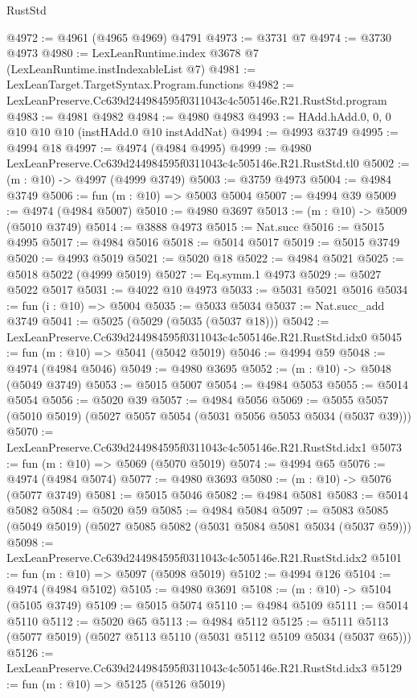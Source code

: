 \begin{lexlean}{RustStd}
\begin{coremodule}
@4972 := @4961 (@4965 @4969) @4791
@4973 := @3731 @7
@4974 := @3730 @4973
@4980 := LexLeanRuntime.index @3678 @7 (LexLeanRuntime.instIndexableList @7)
@4981 := LexLeanTarget.TargetSyntax.Program.functions
@4982 := LexLeanPreserve.Cc639d244984595f0311043c4c505146e.R21.RustStd.program
@4983 := @4981 @4982
@4984 := @4980 @4983
@4993 := HAdd.hAdd.{0, 0, 0} @10 @10 @10 (instHAdd.{0} @10 instAddNat)
@4994 := @4993 @3749
@4995 := @4994 @18
@4997 := @4974 (@4984 @4995)
@4999 := @4980 LexLeanPreserve.Cc639d244984595f0311043c4c505146e.R21.RustStd.tl0
@5002 := (m : @10) -> @4997 (@4999 @3749)
@5003 := @3759 @4973
@5004 := @4984 @3749
@5006 := fun (m : @10) => @5003 @5004
@5007 := @4994 @39
@5009 := @4974 (@4984 @5007)
@5010 := @4980 @3697
@5013 := (m : @10) -> @5009 (@5010 @3749)
@5014 := @3888 @4973
@5015 := Nat.succ
@5016 := @5015 @4995
@5017 := @4984 @5016
@5018 := @5014 @5017
@5019 := @5015 @3749
@5020 := @4993 @5019
@5021 := @5020 @18
@5022 := @4984 @5021
@5025 := @5018 @5022 (@4999 @5019)
@5027 := Eq.symm.{1} @4973
@5029 := @5027 @5022 @5017
@5031 := @4022 @10 @4973
@5033 := @5031 @5021 @5016
@5034 := fun (i : @10) => @5004
@5035 := @5033 @5034
@5037 := Nat.succ_add @3749
@5041 := @5025 (@5029 (@5035 (@5037 @18)))
@5042 := LexLeanPreserve.Cc639d244984595f0311043c4c505146e.R21.RustStd.idx0
@5045 := fun (m : @10) => @5041 (@5042 @5019)
@5046 := @4994 @59
@5048 := @4974 (@4984 @5046)
@5049 := @4980 @3695
@5052 := (m : @10) -> @5048 (@5049 @3749)
@5053 := @5015 @5007
@5054 := @4984 @5053
@5055 := @5014 @5054
@5056 := @5020 @39
@5057 := @4984 @5056
@5069 := @5055 @5057 (@5010 @5019) (@5027 @5057 @5054 (@5031 @5056 @5053 @5034 (@5037 @39)))
@5070 := LexLeanPreserve.Cc639d244984595f0311043c4c505146e.R21.RustStd.idx1
@5073 := fun (m : @10) => @5069 (@5070 @5019)
@5074 := @4994 @65
@5076 := @4974 (@4984 @5074)
@5077 := @4980 @3693
@5080 := (m : @10) -> @5076 (@5077 @3749)
@5081 := @5015 @5046
@5082 := @4984 @5081
@5083 := @5014 @5082
@5084 := @5020 @59
@5085 := @4984 @5084
@5097 := @5083 @5085 (@5049 @5019) (@5027 @5085 @5082 (@5031 @5084 @5081 @5034 (@5037 @59)))
@5098 := LexLeanPreserve.Cc639d244984595f0311043c4c505146e.R21.RustStd.idx2
@5101 := fun (m : @10) => @5097 (@5098 @5019)
@5102 := @4994 @126
@5104 := @4974 (@4984 @5102)
@5105 := @4980 @3691
@5108 := (m : @10) -> @5104 (@5105 @3749)
@5109 := @5015 @5074
@5110 := @4984 @5109
@5111 := @5014 @5110
@5112 := @5020 @65
@5113 := @4984 @5112
@5125 := @5111 @5113 (@5077 @5019) (@5027 @5113 @5110 (@5031 @5112 @5109 @5034 (@5037 @65)))
@5126 := LexLeanPreserve.Cc639d244984595f0311043c4c505146e.R21.RustStd.idx3
@5129 := fun (m : @10) => @5125 (@5126 @5019)

\end{coremodule}
\end{lexlean}
